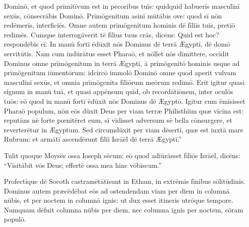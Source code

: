 Dominō, et quod prīmitīvum est in pecoribus tuīs: quidquid
habuerīs masculīnī sexūs, 
cōnsecrābis Dominō. Prīmōgenitum asinī mūtābis ove: quod sī nōn redēmerīs,
interficiēs. Omne autem prīmōgenitum hominis dē fīliīs tuīs, pretiō
redimēs. Cumque interrogāverit tē fīlius tuus crās, dīcēns: Quid est
hoc? respondēbis eī: In manū fortī ēdūxit nōs Dominus dē terrā Ægyptī, dē
domō servitūtis. Nam cum indūrātus esset
Pharaō, et nōllet nōs dīmittere, occīdit Dominus omne
prīmōgenitum in terrā Ægyptī, ā prīmōgenitō hominis usque
ad prīmōgenitum iūmentōrum: idcircō
immolō Dominō omne quod aperit vulvam
masculīnī sexūs, et omnia prīmōgenita fīliōrum meōrum
redimō. Erit igitur quasi signum in manū tuā, et quasi
appēnsum quid, ob
recordātiōnem, inter
oculōs tuōs: eō quod in manū fortī ēdūxit nōs Dominus dē Ægyptō. Igitur
cum ēmīsisset Pharaō populum, nōn eōs dūxit Deus per viam terræ Philisthiim
quæ vīcīna est: reputāns nē forte
pœnitēret eum, sī vīdisset adversum sē bella
cōnsurgere, et reverterētur in Ægyptum. Sed
circumdūxit per viam dēsertī, quæ est iuxtā mare Rubrum:
et armātī ascendērunt fīliī Isrāēl dē terrā Ægyptī.''

Tulit quoque Moysēs
ossa Ioseph sēcum: eō quod adiūrāsset fīliōs Isrāēl,
dīcēns: ``Vīsi\-tābit vōs Deus;
effertē ossa mea hinc vōbīscum.''

Profectīque dē Socoth castramētātī\linebreak sunt in Etham, in
extrēmīs fīnibus sōlitūdinis. Dominus autem præcēdēbat
eōs ad ostendendam viam per diem in columnā nūbis, et per noctem in columnā
ignis: ut dux esset itineris utrōque tempore. Numquam dēfuit columna
nūbis per diem, nec columna ignis per noctem, cōram populō. 

